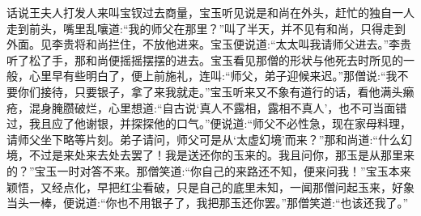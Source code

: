 


\begin{parag}
    话说王夫人打发人来叫宝钗过去商量，宝玉听见说是和尚在外头，赶忙的独自一人走到前头，嘴里乱嚷道:“我的师父在那里？”叫了半天，并不见有和尚，只得走到外面。见李贵将和尚拦住，不放他进来。宝玉便说道:“太太叫我请师父进去。”李贵听了松了手，那和尚便摇摇摆摆的进去。宝玉看见那僧的形状与他死去时所见的一般，心里早有些明白了，便上前施礼，连叫:“师父，弟子迎候来迟。”那僧说:“我不要你们接待，只要银子，拿了来我就走。”宝玉听来又不象有道行的话，看他满头癞疮，混身腌臜破烂，心里想道:“自古说‘真人不露相，露相不真人’，也不可当面错过，我且应了他谢银，并探探他的口气。”便说道:“师父不必性急，现在家母料理，请师父坐下略等片刻。弟子请问，师父可是从‘太虚幻境’而来？”那和尚道:“什么幻境，不过是来处来去处去罢了！我是送还你的玉来的。我且问你，那玉是从那里来的？”宝玉一时对答不来。那僧笑道:“你自己的来路还不知，便来问我！”宝玉本来颖悟，又经点化，早把红尘看破，只是自己的底里未知，一闻那僧问起玉来，好象当头一棒，便说道:“你也不用银子了，我把那玉还你罢。”那僧笑道:“也该还我了。”
\end{parag}


